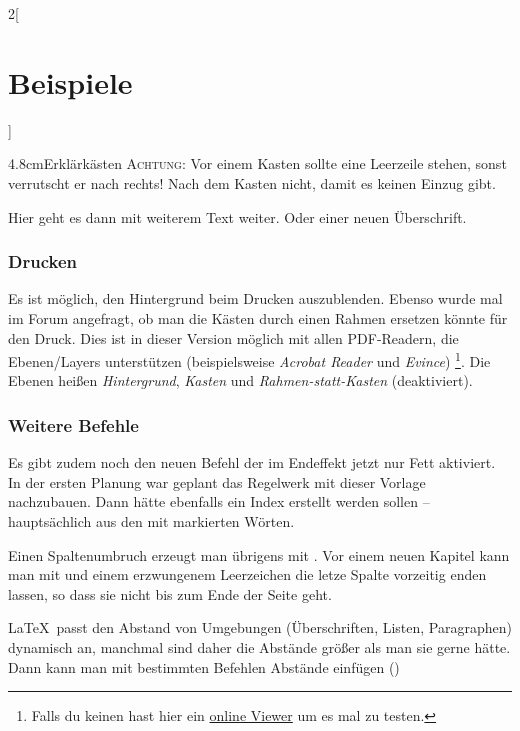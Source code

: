 \documentclass[linksbund,ATvorVT]{rpg-ilaris}
\begin{document}
\begin{multicols}{2}[        %
		\chapter*{Beispiele}  %
		]
\begin{kasten}{4.8cm}{Erklärkästen}
	\textsc{Achtung:} Vor einem Kasten sollte eine Leerzeile stehen, sonst verrutscht er nach rechts! Nach dem Kasten nicht, damit es keinen Einzug gibt.
\end{kasten}

Hier geht es dann mit weiterem Text weiter. Oder einer neuen Überschrift.

\subsection{Drucken}
Es ist möglich, den Hintergrund beim Drucken auszublenden.
Ebenso wurde mal im Forum angefragt, ob man die Kästen durch einen Rahmen ersetzen könnte für den Druck.
Dies ist in dieser Version möglich mit allen PDF-Readern, die Ebenen/Layers unterstützen (beispielsweise \emph{Acrobat Reader} und \emph{Evince})
\footnote{Falls du keinen hast hier ein \href{https://www.pdftron.com/webviewer/demo}{online Viewer} um es mal zu testen.}.
Die Ebenen heißen \emph{Hintergrund}, \emph{Kasten} und \emph{Rahmen-statt-Kasten} (deaktiviert).


\clearpage %

 
\subsection{Weitere Befehle}

Es gibt zudem noch den neuen Befehl  der im Endeffekt jetzt nur Fett aktiviert. In der ersten Planung war geplant das Regelwerk mit dieser Vorlage nachzubauen. Dann hätte ebenfalls ein Index erstellt werden sollen – hauptsächlich aus den mit  markierten Wörten.

Einen Spaltenumbruch erzeugt man übrigens mit . Vor einem neuen Kapitel kann man mit  und einem erzwungenem Leerzeichen die letze Spalte vorzeitig enden lassen, so dass sie nicht bis zum Ende der Seite geht. 

\LaTeX\ passt den Abstand von Umgebungen (Überschriften, Listen, Paragraphen) dynamisch an, manchmal sind daher die Abstände größer als man sie gerne hätte. Dann kann man mit bestimmten Befehlen Abstände einfügen ()


\end{multicols}
\end{document}
